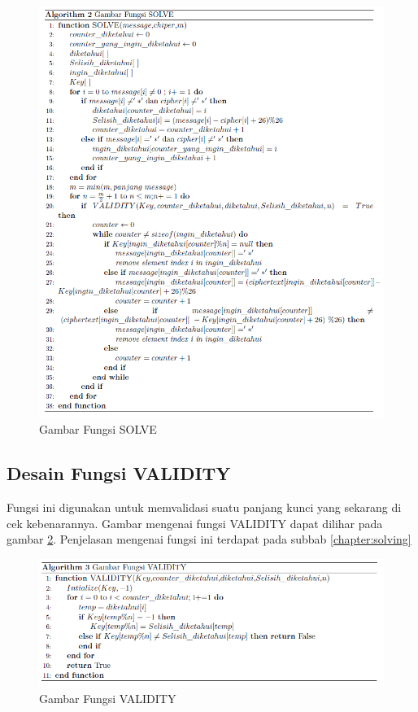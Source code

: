   \begin{figure}[H]
		\centering
		\includegraphics[scale=0.62]{images/bab3/solvefx.png}
		\caption{Gambar Fungsi SOLVE}
		\label{fig:solvefx}
	\end{figure}
	
	\subsection{Desain Fungsi VALIDITY}
	Fungsi ini digunakan untuk memvalidasi suatu panjang kunci yang sekarang di cek kebenarannya. Gambar mengenai fungsi VALIDITY dapat dilihar pada gambar \ref{fig:validity}. Penjelasan mengenai fungsi ini terdapat pada subbab \ref{chapter:solving}
	
 \begin{figure}[H]
		\centering
		\includegraphics[scale=0.5]{images/bab3/validity.png}
		\caption{Gambar Fungsi VALIDITY}
		\label{fig:validity}
	\end{figure}